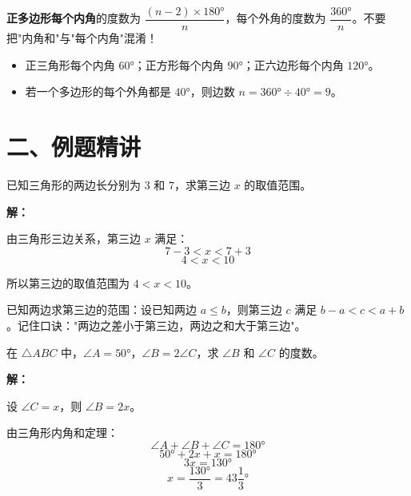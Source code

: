 \documentclass[12pt, a4paper]{ctexart}
\begin{document}
\begin{warnbox}[易错提醒]
\textbf{正多边形每个内角}的度数为 $\dfrac{(n-2) \times 180°}{n}$，每个外角的度数为 $\dfrac{360°}{n}$。不要把"内角和"与"每个内角"混淆！
\end{warnbox}

\begin{tipbox}[规律]
\begin{itemize}[nosep]
  \item 正三角形每个内角 $60°$；正方形每个内角 $90°$；正六边形每个内角 $120°$。
  \item 若一个多边形的每个外角都是 $40°$，则边数 $n = 360° \div 40° = 9$。
\end{itemize}
\end{tipbox}

\section*{\textcolor{examorange}{二、例题精讲}}

\begin{examplebox}
已知三角形的两边长分别为 $3$ 和 $7$，求第三边 $x$ 的取值范围。
\end{examplebox}

\textbf{解：}

由三角形三边关系，第三边 $x$ 满足：
\[
7 - 3 < x < 7 + 3
\]
\[
4 < x < 10
\]

所以第三边的取值范围为 $4 < x < 10$。

\begin{tipbox}[方法总结]
已知两边求第三边的范围：设已知两边 $a \leqslant b$，则第三边 $c$ 满足 $b - a < c < a + b$。记住口诀："两边之差小于第三边，两边之和大于第三边"。
\end{tipbox}

\begin{examplebox}
在 $\triangle ABC$ 中，$\angle A = 50°$，$\angle B = 2\angle C$，求 $\angle B$ 和 $\angle C$ 的度数。
\end{examplebox}

\textbf{解：}

设 $\angle C = x$，则 $\angle B = 2x$。

由三角形内角和定理：
\[
\angle A + \angle B + \angle C = 180°
\]
\[
50° + 2x + x = 180°
\]
\[
3x = 130°
\]
\[
x = \frac{130°}{3} = 43\frac{1}{3}°
\]
\end{document}
